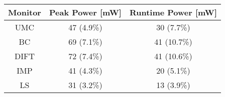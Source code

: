 

\begin{tabular}{|c|c|c|}
\hline

{\bf Monitor} & {\bf Peak Power [mW]} & {\bf Runtime Power [mW]} \\ \hline\hline

UMC  & 47 (4.9\%) & 30 (7.7\%) \\ \hline
BC   & 69 (7.1\%) & 41 (10.7\%) \\ \hline
DIFT & 72 (7.4\%) & 41 (10.6\%) \\ \hline
IMP  & 41 (4.3\%) & 20 (5.1\%) \\ \hline
LS   & 31 (3.2\%) & 13 (3.9\%) \\ \hline

\end{tabular}

